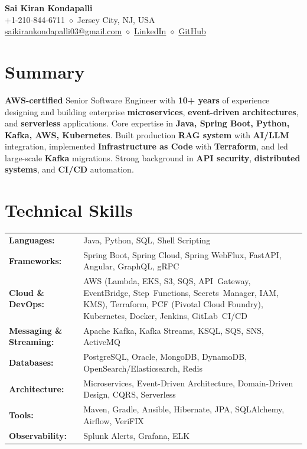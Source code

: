 \documentclass[11pt,a4paper]{article}
\newcommand{\resumeHeader}[4]{
    \begin{center}
        {\Huge\bfseries #1}\\[0.3cm]
        #2 \quad $\diamond$ \quad #3\\[0.15cm]
        #4
    \end{center}
}
\begin{document}

\resumeHeader{Sai Kiran Kondapalli}
{+1-210-844-6711}
{Jersey City, NJ, USA}
{\href{mailto:saikirankondapalli03@gmail.com}{saikirankondapalli03@gmail.com} \quad $\diamond$ \quad \href{https://www.linkedin.com/in/saikirankondapalli}{LinkedIn} \quad $\diamond$ \quad \href{https://github.com/saikirankondapalli}{GitHub}}

\section{Summary}
\small\raggedright{\textbf{AWS-certified} Senior Software Engineer with \textbf{10+ years} of experience designing and building enterprise \textbf{microservices}, \textbf{event-driven architectures}, and \textbf{serverless} applications. Core expertise in \textbf{Java, Spring Boot, Python, Kafka, AWS, Kubernetes}. Built production \textbf{RAG system} with \textbf{AI/LLM} integration, implemented \textbf{Infrastructure as Code} with \textbf{Terraform}, and led large-scale \textbf{Kafka} migrations. Strong background in \textbf{API security}, \textbf{distributed systems}, and \textbf{CI/CD} automation.}

\section{Technical Skills}
\renewcommand{\arraystretch}{1.1}
\begin{tabularx}{\textwidth}{@{}lX@{}}
    \textbf{Languages:} & Java, Python, SQL, Shell Scripting\\
    \textbf{Frameworks:} & Spring Boot, Spring Cloud, Spring WebFlux, FastAPI, Angular, GraphQL, gRPC\\
    \textbf{Cloud \& DevOps:} & AWS (Lambda, EKS, S3, SQS, API~Gateway, EventBridge, Step~Functions, Secrets~Manager, IAM, KMS), Terraform, PCF (Pivotal Cloud Foundry), Kubernetes, Docker, Jenkins, GitLab~CI/CD\\
    \textbf{Messaging \& Streaming:} & Apache Kafka, Kafka Streams, KSQL, SQS, SNS, ActiveMQ\\
    \textbf{Databases:} & PostgreSQL, Oracle, MongoDB, DynamoDB, OpenSearch/Elasticsearch, Redis\\
    \textbf{Architecture:} & Microservices, Event-Driven Architecture, Domain-Driven Design, CQRS, Serverless\\
    \textbf{Tools:} & Maven, Gradle, Ansible, Hibernate, JPA, SQLAlchemy, Airflow, VeriFIX\\
    \textbf{Observability:} & Splunk Alerts, Grafana, ELK \\

\end{tabularx}
\renewcommand{\arraystretch}{1}
\end{document}
